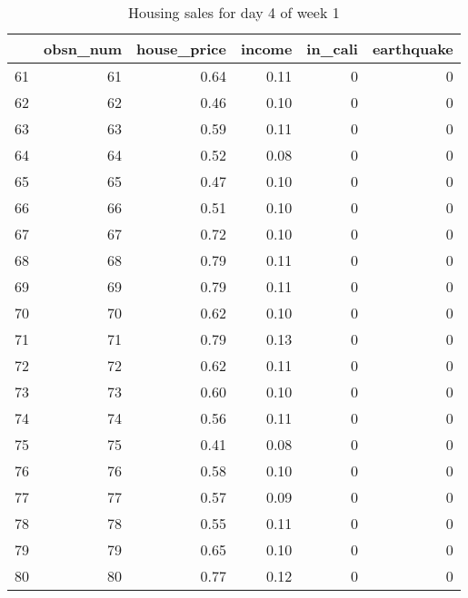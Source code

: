 \begin{table}[ht]
\centering
\begin{tabular}{rrrrrr}
  \hline
 & obsn\_num & house\_price & income & in\_cali & earthquake \\ 
  \hline
61 &  61 & 0.64 & 0.11 &   0 &   0 \\ 
  62 &  62 & 0.46 & 0.10 &   0 &   0 \\ 
  63 &  63 & 0.59 & 0.11 &   0 &   0 \\ 
  64 &  64 & 0.52 & 0.08 &   0 &   0 \\ 
  65 &  65 & 0.47 & 0.10 &   0 &   0 \\ 
  66 &  66 & 0.51 & 0.10 &   0 &   0 \\ 
  67 &  67 & 0.72 & 0.10 &   0 &   0 \\ 
  68 &  68 & 0.79 & 0.11 &   0 &   0 \\ 
  69 &  69 & 0.79 & 0.11 &   0 &   0 \\ 
  70 &  70 & 0.62 & 0.10 &   0 &   0 \\ 
  71 &  71 & 0.79 & 0.13 &   0 &   0 \\ 
  72 &  72 & 0.62 & 0.11 &   0 &   0 \\ 
  73 &  73 & 0.60 & 0.10 &   0 &   0 \\ 
  74 &  74 & 0.56 & 0.11 &   0 &   0 \\ 
  75 &  75 & 0.41 & 0.08 &   0 &   0 \\ 
  76 &  76 & 0.58 & 0.10 &   0 &   0 \\ 
  77 &  77 & 0.57 & 0.09 &   0 &   0 \\ 
  78 &  78 & 0.55 & 0.11 &   0 &   0 \\ 
  79 &  79 & 0.65 & 0.10 &   0 &   0 \\ 
  80 &  80 & 0.77 & 0.12 &   0 &   0 \\ 
   \hline
\end{tabular}
\caption{Housing sales for day 4 of week 1} 
\end{table}
